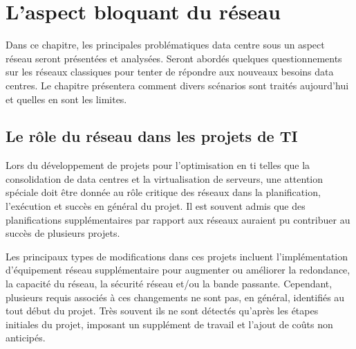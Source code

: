 


\chapter{L'aspect bloquant du réseau}
Dans ce chapitre, les principales problématiques data centre sous un aspect réseau seront présentées et analysées. Seront abordés quelques questionnements sur les réseaux classiques pour tenter de répondre aux nouveaux besoins data centres. Le chapitre présentera comment divers scénarios sont traités aujourd'hui et quelles en sont les limites. 


\section{Le rôle du réseau dans les projets de TI}

Lors du développement de projets pour l'optimisation en \gls{ti} telles que la consolidation de data centres et la virtualisation de serveurs, une attention spéciale doit être donnée au rôle critique des réseaux dans la planification, l'exécution et succès en général du projet. Il est souvent admis que des planifications supplémentaires par rapport aux réseaux auraient pu contribuer au succès de plusieurs projets.



Les principaux types de modifications dans ces projets incluent l'implémentation d'équipement réseau supplémentaire pour augmenter ou améliorer la redondance, la capacité du réseau, la sécurité réseau et/ou la bande passante. Cependant, plusieurs requis associés à ces changements ne sont pas, en général, identifiés au tout début du projet. Très souvent ils ne sont détectés qu'après les étapes initiales du projet, imposant un supplément de travail et l'ajout de coûts non anticipés.



